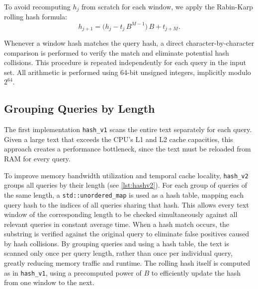 \documentclass{article}
\begin{document}
    To avoid recomputing \(h_j\) from scratch for each window, we apply the Rabin-Karp rolling hash formula:
    \[
        h_{j+1} = \bigl(h_j - t_j \, B^{M-1}\bigr) \, B + t_{j+M}.
    \]

    Whenever a window hash matches the query hash, a direct character-by-character comparison is performed to verify the match and eliminate potential hash collisions.
    This procedure is repeated independently for each query in the input set.
    All arithmetic is performed using 64-bit unsigned integers, implicitly modulo \(2^{64}\).

    \subsection{Grouping Queries by Length}
    The first implementation \texttt{hash\_v1} scans the entire text separately for each query.
    Given a large text that exceeds the CPU's L1 and L2 cache capacities,
    this approach creates a performance bottleneck, since the text must be reloaded from RAM for every query.

    To improve memory bandwidth utilization and temporal cache locality, \texttt{hash\_v2} groups all queries by their length (see \autoref{lst:hashv2}).
    For each group of queries of the same length, a \texttt{std::unordered\_map} is used as a hash table, mapping each query hash to the indices of all queries sharing that hash.
    This allows every text window of the corresponding length to be checked simultaneously against all relevant queries in constant average time.
    When a hash match occurs, the substring is verified against the original query to eliminate false positives caused by hash collisions.
    By grouping queries and using a hash table, the text is scanned only once per query length, rather than once per individual query, greatly reducing memory traffic and runtime.
    The rolling hash itself is computed as in \texttt{hash\_v1}, using a precomputed power of $B$ to efficiently update the hash from one window to the next.
\end{document}
